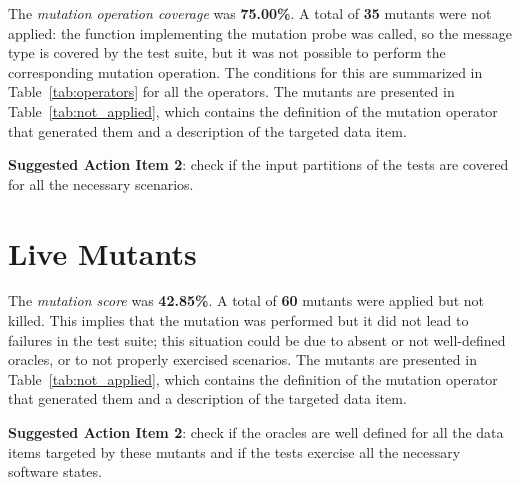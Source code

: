 The \emph{mutation operation coverage} was \textbf{75.00\%}. A total of \textbf{35} mutants were not applied: the function implementing the mutation probe was called, so the message type is covered by the test suite, but it was not possible to perform the corresponding mutation operation.
The conditions for this are summarized in Table~\ref{tab:operators} for all the operators.
The mutants are presented in Table~\ref{tab:not_applied}, which contains the definition of the mutation operator that generated them and a description of the targeted data item.


 

\textbf{Suggested Action Item 2}: check if the input partitions of the tests are covered for all the necessary scenarios.

\section{Live Mutants}

 The \emph{mutation score} was \textbf{42.85\%}. A total of \textbf{60} mutants were applied but not killed. This implies that the mutation was performed but it did not lead to failures in the test suite; this situation could be due to absent or not well-defined oracles, or to not properly exercised scenarios.
 The mutants are presented in Table~\ref{tab:not_applied}, which contains the definition of the mutation operator that generated them and a description of the targeted data item.



\textbf{Suggested Action Item 2}: check if the oracles are well defined for all the data items targeted by these mutants and if the tests exercise all the necessary software states.
